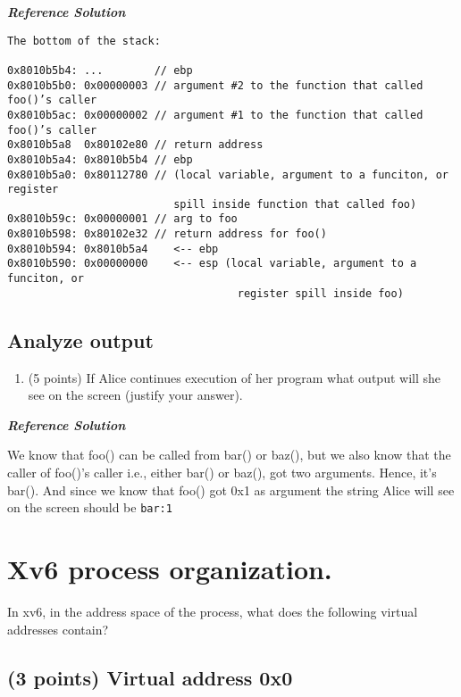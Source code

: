 \documentclass[]{article}
\providecommand{\tightlist}{%
  \setlength{\itemsep}{0pt}\setlength{\parskip}{0pt}}
\begin{document}
\textbf{\emph{Reference Solution}}

\begin{verbatim}
The bottom of the stack:

0x8010b5b4: ...        // ebp
0x8010b5b0: 0x00000003 // argument #2 to the function that called foo()’s caller
0x8010b5ac: 0x00000002 // argument #1 to the function that called foo()’s caller
0x8010b5a8  0x80102e80 // return address
0x8010b5a4: 0x8010b5b4 // ebp
0x8010b5a0: 0x80112780 // (local variable, argument to a funciton, or register
                          spill inside function that called foo)
0x8010b59c: 0x00000001 // arg to foo
0x8010b598: 0x80102e32 // return address for foo()
0x8010b594: 0x8010b5a4    <-- ebp
0x8010b590: 0x00000000    <-- esp (local variable, argument to a funciton, or 
                                    register spill inside foo)
\end{verbatim}

\hypertarget{analyze-output}{%
\subsection{Analyze output}\label{analyze-output}}

\begin{enumerate}
\def\labelenumi{(\alph{enumi})}
\setcounter{enumi}{1}
\tightlist
\item
  (5 points) If Alice continues execution of her program what output
  will she see on the screen (justify your answer).
\end{enumerate}

\textbf{\emph{Reference Solution}}

We know that foo() can be called from bar() or baz(), but we also know
that the caller of foo()'s caller i.e., either bar() or baz(), got two
arguments. Hence, it's bar(). And since we know that foo() got 0x1 as
argument the string Alice will see on the screen should be
\texttt{bar:1}

\hypertarget{xv6-process-organization.}{%
\section{Xv6 process organization.}\label{xv6-process-organization.}}

In xv6, in the address space of the process, what does the following
virtual addresses contain?

\hypertarget{points-virtual-address-0x0}{%
\subsection{(3 points) Virtual address
0x0}\label{points-virtual-address-0x0}}
\end{document}
